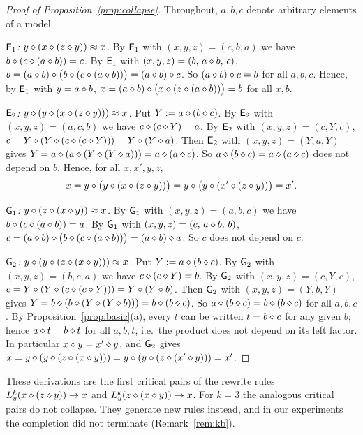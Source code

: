 \begin{proof}[Proof of Proposition~\ref{prop:collapse}]
Throughout, $a,b,c$ denote arbitrary elements of a model.

\emph{$\E{1}$: $y\op(x\op(z\op y))\approx x$.}
By $\E{1}$ with $(x,y,z)=(c,b,a)$ we have $b\op(c\op(a\op b))=c$. By $\E{1}$
with $(x,y,z)=(b,\,a\op b,\,c)$,
$b=(a\op b)\op\bigl(b\op(c\op(a\op b))\bigr)=(a\op b)\op c$. So
$(a\op b)\op c=b$ for all $a,b,c$. Hence, by $\E{1}$ with $y=a\op b$,
$x=(a\op b)\op\bigl(x\op(z\op(a\op b))\bigr)=b$ for all $x,b$.

\smallskip\noindent
\emph{$\E{2}$: $y\op(y\op(x\op(z\op y)))\approx x$.}
Put $Y:=a\op(b\op c)$. By $\E{2}$ with $(x,y,z)=(a,c,b)$ we have
$c\op(c\op Y)=a$. By $\E{2}$ with $(x,y,z)=(c,Y,c)$,
$c=Y\op(Y\op(c\op(c\op Y)))=Y\op(Y\op a)$. Then $\E{2}$ with
$(x,y,z)=(Y,a,Y)$ gives $Y=a\op(a\op(Y\op(Y\op a)))=a\op(a\op c)$. So
$a\op(b\op c)=a\op(a\op c)$ does not depend on $b$. Hence, for all
$x,x',y,z$,
\[
  x=y\op\bigl(y\op(x\op(z\op y))\bigr)=y\op\bigl(y\op(x'\op(z\op y))\bigr)=x'.
\]

\smallskip\noindent
\emph{$\G{1}$: $y\op(z\op(x\op y))\approx x$.}
By $\G{1}$ with $(x,y,z)=(a,b,c)$ we have $b\op(c\op(a\op b))=a$. By $\G{1}$
with $(x,y,z)=(c,\,a\op b,\,b)$,
$c=(a\op b)\op\bigl(b\op(c\op(a\op b))\bigr)=(a\op b)\op a$. So $c$ does not
depend on $c$.

\smallskip\noindent
\emph{$\G{2}$: $y\op(y\op(z\op(x\op y)))\approx x$.}
Put $Y:=a\op(b\op c)$. By $\G{2}$ with $(x,y,z)=(b,c,a)$ we have
$c\op(c\op Y)=b$. By $\G{2}$ with $(x,y,z)=(c,Y,c)$,
$c=Y\op(Y\op(c\op(c\op Y)))=Y\op(Y\op b)$. Then $\G{2}$ with
$(x,y,z)=(Y,b,Y)$ gives $Y=b\op(b\op(Y\op(Y\op b)))=b\op(b\op c)$. So
$a\op(b\op c)=b\op(b\op c)$ for all $a,b,c$. By Proposition~\ref{prop:basic}(a),
every $t$ can be written $t=b\op c$ for any given $b$; hence $a\op t=b\op t$ for
all $a,b,t$, i.e.\ the product does not depend on its left factor. In
particular $x\op y=x'\op y$, and $\G{2}$ gives
$x=y\op(y\op(z\op(x\op y)))=y\op(y\op(z\op(x'\op y)))=x'$.
\end{proof}

\begin{remark}
These derivations are the first critical pairs of the rewrite rules
$L_y^k(x\op(z\op y))\to x$ and $L_y^k(z\op(x\op y))\to x$. For $k=3$ the
analogous critical pairs do not collapse. They generate new rules instead,
and in our experiments the completion did not terminate (Remark~\ref{rem:kb}).
\end{remark}

